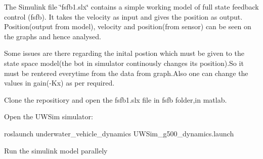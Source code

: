 The Simulink file \char`\"{}fsfb1.\+slx\char`\"{} contains a simple working model of full state feedback control (fsfb). It takes the velocity as input and gives the position as output. Position(output from model), velocity and position(from sensor) can be seen on the graphs and hence analysed.

Some issues are there regarding the inital postion which must be given to the state space model(the bot in simulator continously changes its position).So it must be rentered everytime from the data from graph.\+Also one can change the values in gain(-\/\+Kx) as per required.


\begin{DoxyEnumerate}
\item Clone the repositiory and open the fsfb1.\+slx file in fsfb folder,in matlab.
\item Open the U\+W\+Sim simulator\+: 
\begin{DoxyCode}
roslaunch underwater\_vehicle\_dynamics UWSim\_g500\_dynamics.launch 
\end{DoxyCode}

\item Run the simulink model parallely 
\end{DoxyEnumerate}